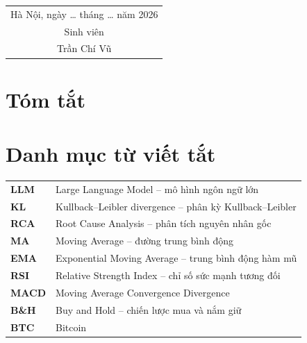 \documentclass[12pt,a4paper,oneside]{report}
\begin{document}
\vspace{1.5cm}
\hfill\begin{tabular}{c}
Hà Nội, ngày \dots{} tháng \dots{} năm 2026\\
Sinh viên\\[2cm]
Trần Chí Vũ
\end{tabular}

\chapter*{Tóm tắt}


\tableofcontents
\listoffigures
\listoftables

\chapter*{Danh mục từ viết tắt}
\begin{tabular}{>{\bfseries}p{3cm} p{11cm}}
LLM & Large Language Model -- mô hình ngôn ngữ lớn \\
KL & Kullback--Leibler divergence -- phân kỳ Kullback--Leibler \\
RCA & Root Cause Analysis -- phân tích nguyên nhân gốc \\
MA & Moving Average -- đường trung bình động \\
EMA & Exponential Moving Average -- trung bình động hàm mũ \\
RSI & Relative Strength Index -- chỉ số sức mạnh tương đối \\
MACD & Moving Average Convergence Divergence \\
B\&H & Buy and Hold -- chiến lược mua và nắm giữ \\
BTC & Bitcoin \\
\end{tabular}

\cleardoublepage
{}








\renewcommand{\bibname}{Tài liệu tham khảo}


\appendix

\end{document}
